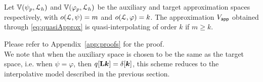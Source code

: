 \begin{prop}
  Let $\aspace{\lattice{L}_h}{\psi_p}$ and
  $\aspace{\lattice{L}_h}{\varphi_p}$ be the auxiliary and target
  approximation spaces respectively, with $\order{\lattice{L}}{\psi} = m$ and
  $\order{\lattice{L}}{\varphi} = k$. The approximation $\appf{V}$ obtained
  through \eqref{eq:quasiApprox} is quasi-interpolating of order $k$
  if $m \ge k$.
\label{prop:2}
\end{prop}
Please refer to Appendix~\ref{app:proofs} for the proof.\\
We note that when the auxiliary space is chosen to be the same as the
target space, i.e. when $\psi = \varphi$, then $q[\mat{L}\vect{k}] =
\delta[\vect{k}]$, this scheme reduces to the interpolative model
described in the previous section.
